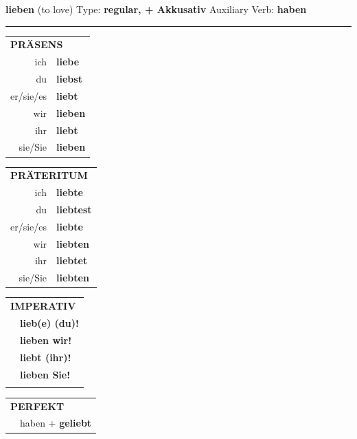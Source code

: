 \documentclass[10pt,a4paper]{revtex4-2}
\begin{document}
\begin{verbbox-acc}
    {\Large \bf lieben} (to love) \hfill Type: \textbf{regular, + Akkusativ} \hfill Auxiliary Verb: \textbf{haben} 
    
     \vspace{5pt}

    \hrule
    
    \vspace{5pt}

  \begin{tabular}{rl}
     \multicolumn{2}{l}{\textbf{PRÄSENS} }\\
    ich & \textbf{liebe}\\
    du & \textbf{liebst}\\
    er/sie/es & \textbf{liebt}\\
    wir & \textbf{lieben}\\
    ihr & \textbf{liebt}\\
    sie/Sie & \textbf{lieben}\\
  \end{tabular}
  \hfill
     \begin{tabular}{rl}
    \multicolumn{2}{l}{\textbf{PRÄTERITUM} }\\
    ich & \textbf{liebte}\\
    du & \textbf{liebtest}\\
    er/sie/es & \textbf{liebte}\\
    wir & \textbf{liebten}\\
    ihr & \textbf{liebtet}\\
    sie/Sie & \textbf{liebten}\\
  \end{tabular}
  \hfill
  \begin{tabular}{rl}
     \multicolumn{2}{l}{\textbf{IMPERATIV} }\\
   & \textbf{lieb(e) (du)!}\\
   & \textbf{lieben wir!}\\
   & \textbf{liebt (ihr)!}\\
   & \textbf{lieben Sie!}\\
   & \vspace{10pt}
  \end{tabular}

    \vspace{10pt}

 \begin{tabular}{rl}
     \multicolumn{2}{l}{\textbf{PERFEKT}}\\
   & haben + \textbf{geliebt}\\
  \end{tabular}
\hfill
   \begin{tabular}{rl}
   

\end{tabular}
\end{verbbox-acc}
\end{document}

